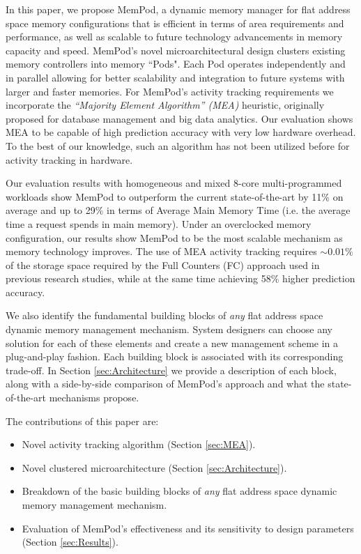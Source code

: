 In this paper, we propose MemPod, a dynamic memory manager for flat address space memory configurations that is efficient in terms of area requirements and performance, as well as scalable to future technology advancements in memory capacity and speed. MemPod's novel microarchitectural design clusters existing memory controllers into memory ``Pods". Each Pod operates independently and in parallel allowing for better scalability and integration to future systems with larger and faster memories. For MemPod's activity tracking requirements we incorporate the \emph{``Majority Element Algorithm'' (MEA)} heuristic, originally proposed for database management and big data analytics. Our evaluation shows MEA to be capable of high prediction accuracy with very low hardware overhead. To the best of our knowledge, such an algorithm has not been utilized before for activity tracking in hardware.

Our evaluation results with homogeneous and mixed 8-core multi-programmed workloads show MemPod to outperform the current state-of-the-art by 11\% on average and up to 29\% in terms of Average Main Memory Time (i.e. the average time a request spends in main memory). Under an overclocked memory configuration, our results show MemPod to be the most scalable mechanism as memory technology improves. The use of MEA activity tracking requires $\sim0.01\%$ of the storage space required by the Full Counters (FC) approach used in previous research studies, while at the same time achieving 58\% higher prediction accuracy.

We also identify the fundamental building blocks of \emph{any} flat address space dynamic memory management mechanism. System designers can choose any solution for each of these elements and create a new management scheme in a plug-and-play fashion. Each building block is associated with its corresponding trade-off. In Section \ref{sec:Architecture} we provide a description of each block, along with a side-by-side comparison of MemPod's approach and what the state-of-the-art mechanisms propose.

The contributions of this paper are:

\begin{itemize}
\item Novel activity tracking algorithm (Section \ref{sec:MEA}).
\item Novel clustered microarchitecture (Section \ref{sec:Architecture}).
\item Breakdown of the basic building blocks of \emph{any} flat address space dynamic memory management mechanism. 
\item Evaluation of MemPod's effectiveness and its sensitivity to design parameters (Section \ref{sec:Results}).
\end{itemize}

